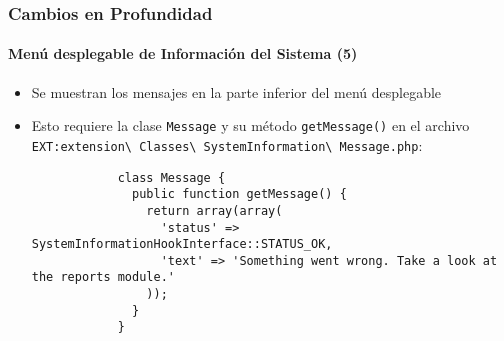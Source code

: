 \begin{frame}[fragile]
	\frametitle{Cambios en Profundidad}
	\framesubtitle{Menú desplegable de Información del Sistema (5)}

	\lstset{basicstyle=\tiny\ttfamily}

	\begin{itemize}

		\item Se muestran los mensajes en la parte inferior del menú desplegable

		\item Esto requiere la clase \texttt{Message} y su método \texttt{getMessage()} en el archivo
			\small
				\texttt{EXT:extension\textbackslash
					Classes\textbackslash
					SystemInformation\textbackslash
					Message.php}:
			\normalsize

		\begin{lstlisting}
			class Message {
			  public function getMessage() {
			    return array(array(
			      'status' => SystemInformationHookInterface::STATUS_OK,
			      'text' => 'Something went wrong. Take a look at the reports module.'
			    ));
			  }
			}
		\end{lstlisting}

	\end{itemize}

\end{frame}


